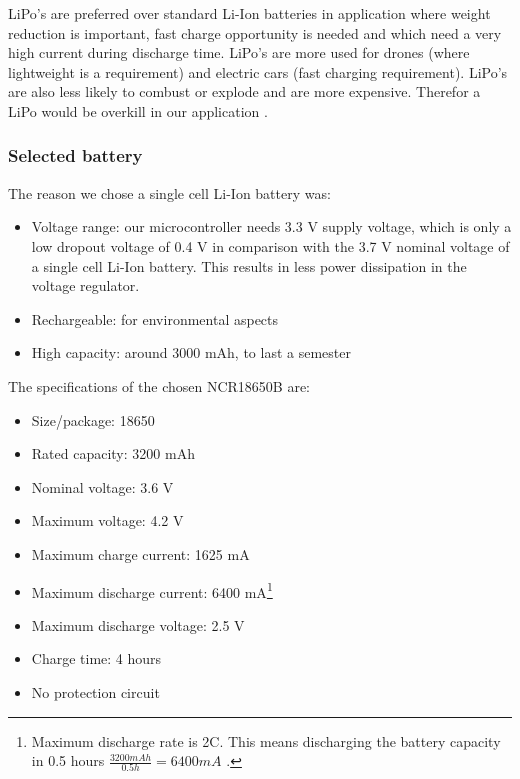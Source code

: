 \documentclass[11pt,a4paper]{article}
\begin{document}
LiPo's are preferred over standard Li-Ion batteries in application where weight reduction is important, fast charge opportunity is needed and which need a very high current during discharge time. LiPo's are more used for drones (where lightweight is a requirement) and electric cars (fast charging requirement). LiPo's are also less likely to combust or explode and are more expensive. Therefor a LiPo would be overkill in our application \cite{LiIonVsLiPo_Ovonic,LiIon_Wiki,LiPo_Wiki}. 

\subsubsection{Selected battery}
The reason we chose a single cell Li-Ion battery was:
\begin{itemize}
	\item Voltage range: our microcontroller needs 3.3 V supply voltage, which is only a low dropout voltage of 0.4 V in comparison with the 3.7 V nominal voltage of a single cell Li-Ion battery. This results in less power dissipation in the voltage regulator. 
	\item Rechargeable: for environmental aspects
	\item High capacity: around 3000 mAh, to last a semester
\end{itemize}
The specifications of the chosen NCR18650B are:
\begin{itemize}
	\item Size/package: 18650
	\item Rated capacity: 3200 mAh
	\item Nominal voltage: 3.6 V
	\item Maximum voltage: 4.2 V
	\item Maximum charge current: 1625 mA
	\item Maximum discharge current: 6400 mA\footnote{Maximum discharge rate is 2C. This means discharging the battery capacity in 0.5 hours $\frac{3200 mAh}{0.5 h} = 6400 mA$ .} %
	\item Maximum discharge voltage: 2.5 V
	\item Charge time: 4 hours
	\item No protection circuit
\end{itemize}
\end{document}
